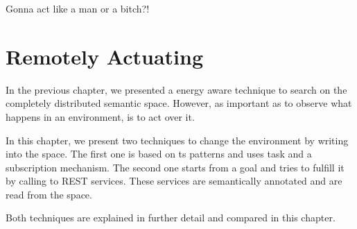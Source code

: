 

\begin{savequote}[50mm]
Gonna act like a man or a bitch?!
\end{savequote}


\chapter{Remotely Actuating}
\label{cha:actuate}
\newcommand{\pathchapfive}{5_actuate}


\ifpdf
    \graphicspath{{\pathchapfive/figures/PNG/}{\pathchapfive/figures/PDF/}{\pathchapfive/figures/}}
\else
    \graphicspath{{\pathchapfive/figures/EPS/}{\pathchapfive/figures/}}
\fi



In the previous chapter, we presented a energy aware technique to search on the completely distributed semantic space.
However, as important as to observe what happens in an environment, is to act over it.

In this chapter, we present two techniques to change the environment by writing into the space.
The first one is based on \ac{ts} patterns and uses task and a subscription mechanism.
The second one starts from a goal and tries to fulfill it by calling to REST services.
These services are semantically annotated and are read from the space.

Both techniques are explained in further detail and compared in this chapter.



